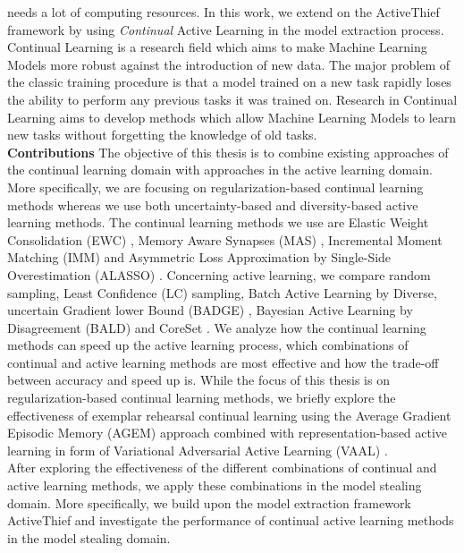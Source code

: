 needs a lot of computing resources. In this work, we extend on the ActiveThief framework by using \textit{Continual} Active Learning in the model
extraction process.\\
Continual Learning is a research field which aims to make Machine Learning Models more robust against the introduction of new data. The major problem
of the classic training procedure is that a model trained on a new task rapidly loses the ability to perform any previous tasks it was trained on.
Research in Continual Learning aims to develop methods which allow Machine Learning Models to learn new tasks without forgetting the knowledge of old 
tasks. \\
\textbf{Contributions} \hspace{0.2cm} The objective of this thesis is to combine existing approaches of the continual learning domain
 with approaches in the active learning domain. More specifically, we are focusing on regularization-based continual learning methods
whereas we use both uncertainty-based and diversity-based active learning methods. The continual learning methods we use are Elastic
Weight Consolidation (EWC) \cite{kirkpatrick2017overcoming}, Memory Aware Synapses (MAS) \cite{aljundi2018memory}, Incremental Moment Matching
(IMM) \cite{lee2017overcoming} and Asymmetric Loss Approximation by Single-Side Overestimation (ALASSO) \cite{park2019continual}.
Concerning active learning, we compare random sampling, Least Confidence (LC) \cite{lewis1994sequential} sampling, Batch Active Learning by
Diverse, uncertain Gradient lower Bound (BADGE) \cite{ash2019deep}, Bayesian Active Learning by Disagreement (BALD) \cite{houlsby2011bayesian} and
CoreSet \cite{sener2017active}.
We analyze how the continual learning methods can speed up the active learning process, which combinations of continual and active learning methods
are most effective and how the trade-off between accuracy and speed up is. While the focus of this thesis is on regularization-based continual
learning methods, we briefly explore the effectiveness of exemplar rehearsal continual learning using the Average Gradient Episodic Memory (AGEM)
approach \cite{chaudhry2018efficient} combined with representation-based active learning in form of Variational Adversarial Active Learning (VAAL)
\cite{sinha2019variational}. \\
After exploring the effectiveness of the different combinations of continual and active learning methods, we apply these combinations in the model stealing
domain. More specifically, we build upon the model extraction framework ActiveThief \cite{pal2020activethief} and investigate the performance of continual
active learning methods in the model stealing domain.
